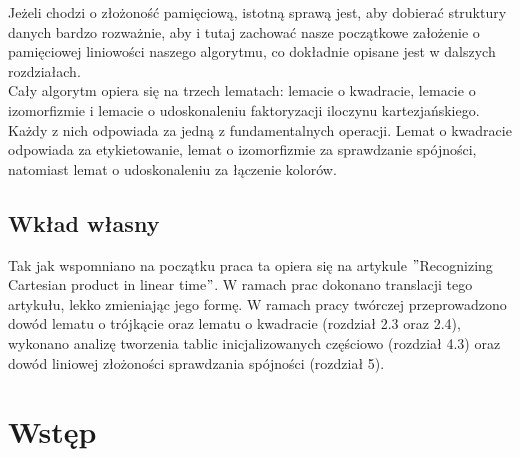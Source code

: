 \documentclass[12pt,a4paper,titlepage]{article}
\begin{document}
Jeżeli chodzi o złożoność pamięciową, istotną sprawą jest, aby dobierać struktury danych bardzo rozważnie, aby i tutaj zachować nasze początkowe założenie o pamięciowej liniowości naszego algorytmu, co dokładnie opisane jest w dalszych rozdziałach. \\
Cały algorytm opiera się na trzech lematach: lemacie o kwadracie, lemacie o izomorfizmie i lemacie o udoskonaleniu faktoryzacji iloczynu kartezjańskiego. Każdy z nich odpowiada za jedną z fundamentalnych operacji. Lemat o kwadracie odpowiada za etykietowanie, lemat o izomorfizmie za sprawdzanie spójności, natomiast lemat o udoskonaleniu za łączenie kolorów.
\subsection{Wkład własny}
Tak jak wspomniano na początku praca ta opiera się na artykule $"$Recognizing Cartesian product in linear time$"$. W ramach prac dokonano translacji tego artykułu, lekko zmieniając jego formę. W ramach pracy twórczej przeprowadzono dowód lematu o trójkącie oraz lematu o kwadracie (rozdział 2.3 oraz 2.4), wykonano analizę tworzenia tablic inicjalizowanych częściowo (rozdział 4.3) oraz dowód liniowej złożoności sprawdzania spójności (rozdział 5).  
\newpage

\section{Wstęp}
\end{document}
